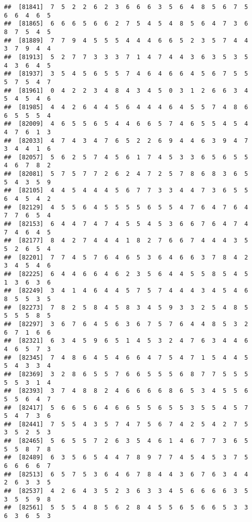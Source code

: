 \documentclass[
]{book}
\begin{document}
\begin{verbatim}
##  [81841]  7  5  2  2  6  2  3  6  6  6  3  5  6  4  8  5  6  7  5  6  6  4  6  5
##  [81865]  6  6  6  5  6  6  2  7  5  4  5  4  8  5  6  4  7  3  6  8  7  5  4  5
##  [81889]  7  7  9  4  5  5  5  4  4  4  6  6  5  2  3  5  7  4  4  3  7  9  4  4
##  [81913]  5  2  7  7  3  3  3  7  1  4  7  4  4  3  6  3  5  3  5  4  3  6  4  5
##  [81937]  3  5  4  5  6  5  5  7  4  6  4  6  6  4  5  6  7  5  5  5  7  5  4  7
##  [81961]  0  4  2  2  3  4  8  4  3  4  5  0  3  1  2  6  6  3  4  5  4  5  4  6
##  [81985]  4  4  2  6  4  4  5  6  4  4  4  6  4  5  5  7  4  8  6  6  5  5  5  4
##  [82009]  4  6  5  5  6  5  4  4  6  6  5  7  4  6  5  5  4  5  4  4  7  6  1  3
##  [82033]  4  7  4  3  4  7  6  5  2  2  6  9  4  4  6  3  9  4  7  3  4  4  1  6
##  [82057]  5  6  2  5  7  4  5  6  1  7  4  5  3  3  6  5  6  5  5  4  6  7  8  2
##  [82081]  5  7  5  7  7  2  6  2  4  7  2  5  7  8  6  8  3  6  5  5  4  3  5  9
##  [82105]  4  4  5  4  4  4  5  6  7  7  3  3  4  4  7  3  6  5  5  6  4  5  4  2
##  [82129]  4  5  5  6  4  5  5  5  5  6  5  5  4  7  6  4  7  6  4  7  7  6  5  4
##  [82153]  6  4  4  7  4  7  4  5  5  4  5  3  6  6  7  6  4  7  4  7  4  6  4  5
##  [82177]  8  4  2  7  4  4  4  1  8  2  7  6  6  7  4  4  4  3  5  5  2  6  5  4
##  [82201]  7  7  4  5  7  6  4  6  5  3  6  4  6  6  3  7  8  4  2  3  4  5  4  6
##  [82225]  6  4  4  6  6  4  6  2  3  5  6  4  4  5  5  8  5  4  5  1  3  6  3  6
##  [82249]  3  4  1  4  6  4  4  5  7  5  7  4  4  4  3  4  5  4  6  8  5  5  3  5
##  [82273]  7  8  2  5  8  4  5  8  3  4  5  9  3  3  2  5  4  8  5  5  5  5  8  5
##  [82297]  3  6  7  6  4  5  6  3  6  7  5  7  6  4  4  8  5  3  2  6  7  1  6  6
##  [82321]  6  3  4  5  9  6  5  1  4  5  3  2  4  7  6  3  4  4  6  4  6  5  7  3
##  [82345]  7  4  8  6  4  5  4  6  6  4  7  5  4  7  1  5  4  4  5  5  4  3  3  4
##  [82369]  3  2  8  6  5  5  7  6  6  5  5  5  6  8  7  7  5  5  5  5  5  3  1  4
##  [82393]  3  7  4  8  8  2  4  6  6  6  6  8  6  5  3  4  5  5  6  5  5  6  4  7
##  [82417]  5  6  6  5  6  4  6  6  5  5  6  5  5  3  5  5  4  5  7  5  4  7  3  6
##  [82441]  7  5  5  4  3  5  7  4  7  5  6  7  4  2  5  4  2  7  5  3  5  2  5  3
##  [82465]  5  6  5  5  7  2  6  3  5  4  6  1  4  6  7  7  3  6  5  5  5  8  7  8
##  [82489]  6  3  5  6  5  4  4  7  8  9  7  7  4  5  4  5  3  7  5  6  6  6  6  7
##  [82513]  6  5  7  5  3  6  4  6  7  8  4  4  3  6  7  6  3  4  4  2  6  3  3  5
##  [82537]  4  2  6  4  3  5  2  3  6  3  3  4  5  6  6  6  6  3  5  3  5  5  9  8
##  [82561]  5  5  5  4  8  5  6  2  8  4  5  5  6  5  6  6  5  3  3  6  3  6  5  3

\end{verbatim}
\end{document}
